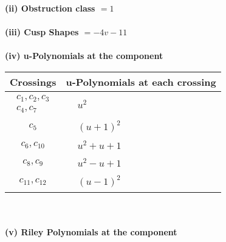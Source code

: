 \documentclass[1p]{elsarticle_modified}
\theoremstyle{definition}
\begin{document}
\flushleft \textbf{(ii) Obstruction class $= 1$}\\~\\
\flushleft \textbf{(iii) Cusp Shapes $= -4 v-11$}\\~\\
\newpage\renewcommand{\arraystretch}{1}
\flushleft \textbf{(iv) u-Polynomials at the component}\newline \\
\begin{tabular}{m{50pt}|m{274pt}}
Crossings & \hspace{64pt}u-Polynomials at each crossing \\
\hline $$\begin{aligned}c_{1},c_{2},c_{3}\\c_{4},c_{7}\end{aligned}$$&$\begin{aligned}
&u^2
\end{aligned}$\\
\hline $$\begin{aligned}c_{5}\end{aligned}$$&$\begin{aligned}
&(u+1)^2
\end{aligned}$\\
\hline $$\begin{aligned}c_{6},c_{10}\end{aligned}$$&$\begin{aligned}
&u^2+u+1
\end{aligned}$\\
\hline $$\begin{aligned}c_{8},c_{9}\end{aligned}$$&$\begin{aligned}
&u^2- u+1
\end{aligned}$\\
\hline $$\begin{aligned}c_{11},c_{12}\end{aligned}$$&$\begin{aligned}
&(u-1)^2
\end{aligned}$\\
\hline
\end{tabular}\\~\\
\newpage\renewcommand{\arraystretch}{1}
\flushleft \textbf{(v) Riley Polynomials at the component}\newline \\
\end{document}
